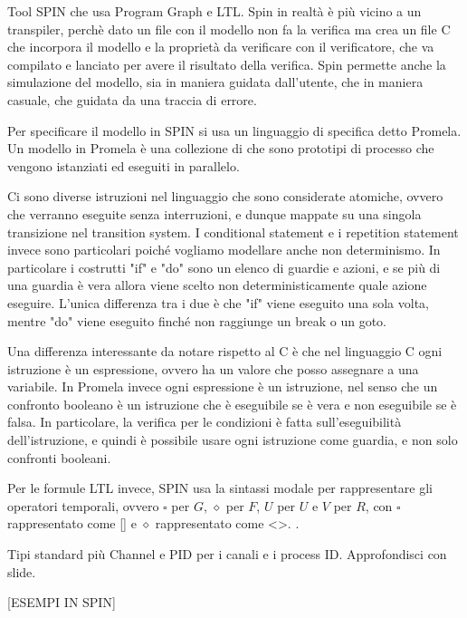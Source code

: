 Tool SPIN che usa Program Graph e LTL. Spin in realtà è più vicino a un transpiler, perchè dato un file con il modello non fa la verifica ma crea un file C che incorpora il modello e la proprietà da verificare con il verificatore, che va compilato e lanciato per avere il risultato della verifica. Spin permette anche la simulazione del modello, sia in maniera guidata dall'utente, che in maniera casuale, che guidata da una traccia di errore.

Per specificare il modello in SPIN si usa un linguaggio di specifica detto Promela. Un modello in Promela è una collezione di  che sono prototipi di processo che vengono istanziati ed eseguiti in parallelo.


Ci sono diverse istruzioni nel linguaggio che sono considerate atomiche, ovvero che verranno eseguite senza interruzioni, e dunque mappate su una singola transizione nel transition system. I conditional statement e i repetition statement invece sono particolari poiché vogliamo modellare anche non determinismo. In particolare i costrutti "if" e "do" sono un elenco di guardie e azioni, e se più di una guardia è vera allora viene scelto non deterministicamente quale azione eseguire. L'unica differenza tra i due è che "if" viene eseguito una sola volta, mentre "do" viene eseguito finché non raggiunge un break o un goto.


Una differenza interessante da notare rispetto al C è che nel linguaggio C ogni istruzione è un espressione, ovvero ha un valore che posso assegnare a una variabile. In Promela invece ogni espressione è un istruzione, nel senso che un confronto booleano è un istruzione che è eseguibile se è vera e non eseguibile se è falsa. In particolare, la verifica per le condizioni è fatta sull'eseguibilità dell'istruzione, e quindi è possibile usare ogni istruzione come guardia, e non solo confronti booleani.

Per le formule LTL invece, SPIN usa la sintassi modale per rappresentare gli operatori temporali, ovvero \(\square\) per \(G\), \(\diamond\) per \(F\), \(U\) per \(U\) e \(V\) per \(R\), con \(\square\) rappresentato come [] e \(\diamond\) rappresentato come <>. .

Tipi standard più Channel e PID per i canali e i process ID. Approfondisci con slide.

  [ESEMPI IN SPIN]


